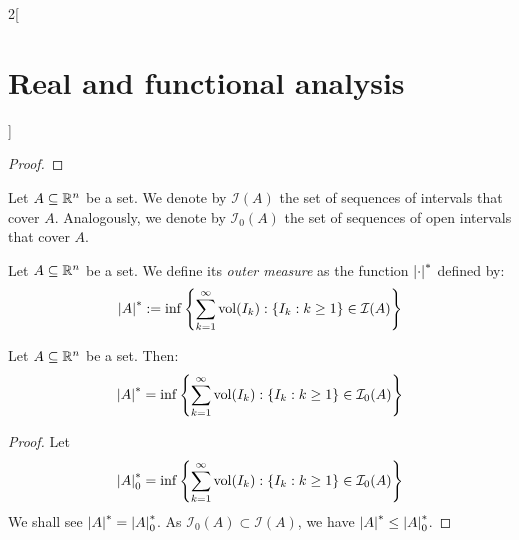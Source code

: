 \documentclass[../../../main_math.tex]{subfiles}
\begin{document}
\begin{multicols}{2}[\section{Real and functional analysis}]
\begin{proof}
  \end{proof}
  \begin{definition}
    Let $A\subseteq\mathbb{R}^n$ be a set. We denote by $\mathcal{I}(A)$ the set of sequences of intervals that cover $A$. Analogously, we denote by $\mathcal{I}_0(A)$ the set of sequences of open intervals that cover $A$.
  \end{definition}
  \begin{definition}
    Let $A\subseteq\mathbb{R}^n$ be a set. We define its \emph{outer measure} as the function $\om{}$ defined by:
    $$\om{A}:=\inf\left\{\sum_{k= 1}^\infty \vol(I_k):\{I_k:k\geq 1\}\in \mathcal{I}(A)\right\}$$
  \end{definition}
  \begin{proposition}
    Let $A\subseteq\mathbb{R}^n$ be a set. Then:
    $$\om{A}=\inf\left\{\sum_{k= 1}^\infty \vol(I_k):\{I_k:k\geq 1\}\in \mathcal{I}_0(A)\right\}$$
  \end{proposition}
  \begin{proof}
    Let $$\om{A}_0=\inf\left\{\sum_{k= 1}^\infty \vol(I_k):\{I_k:k\geq 1\}\in \mathcal{I}_0(A)\right\}$$ We shall see $\om{A}=\om{A}_0$. As $\mathcal{I}_0(A)\subset\mathcal{I}(A)$, we have $\om{A}\leq\om{A}_0$.


\end{proof}
\end{multicols}
\end{document}

